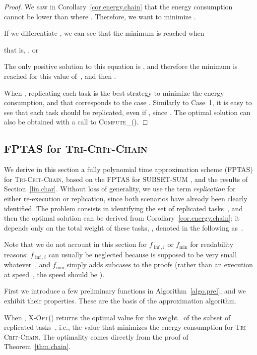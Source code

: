 \documentclass[a4paper]{article}
\theoremstyle{plain}
\theoremstyle{definition}
\theoremstyle{remark}
\newcommand{\fmin}{\ensuremath{f_{\min}}\xspace}
\newcommand{\finf}{\ensuremath{f_{\inf,i}}\xspace}
\newcommand{\xopt}{\textsc{X-Opt}}
\newcommand{\computeVl}{\textsc{Compute\_}}
\newcommand{\chain}{\textsc{Tri-Crit-Chain}\xspace}
\begin{document}
\begin{proof}
We saw in Corollary~\ref{cor.energy.chain} that the energy consumption
cannot be lower than  where .  Therefore, we want to minimize .

If we differentiate , we can see that the minimum is reached when 

that 
is, , or 

The only positive solution to this equation is , and
therefore the minimum is reached for this value of~, and then 
.  

When , replicating each task is the best strategy to 
minimize the energy consumption, and that corresponds to the case 
. Similarly to Case~1, it is easy to see that
each task should be replicated, even if , since \mbox{.} The optimal solution can also be obtained with a
call to \computeVl(). 
\end{proof}


\subsection{FPTAS for \chain}
\label{lin.fptas}

We derive in this section a fully polynomial time approximation scheme
(FPTAS) for \chain, based on the FPTAS for SUBSET-SUM \cite{cormen},
and the results of Section~\ref{lin.char}. Without loss of generality,
we use the term {\em replication} for either re-execution or
replication, since both scenarios have already been clearly
identified. The problem consists in identifying the set of replicated
tasks~, and then the optimal solution can be derived from
Corollary~\ref{cor.energy.chain}; it depends only on the total weight
of these tasks, , denoted in the following
as~.

Note that we do not account in this section for \finf or \fmin for
readability reasons: \finf can usually be neglected because  is supposed to be very small whatever~, and \fmin simply
adds subcases to the proofs (rather than an execution at speed~,
the speed should be ).


\medskip
First we introduce a few preliminary functions in
Algorithm~\ref{algo.prel}, and we exhibit their properties. These are
the basis of the approximation algorithm. 

When , \xopt() returns the optimal value for
the weight~ of the subset of replicated tasks~, i.e.,
the value that minimizes the energy consumption for \chain. 
The optimality comes directly from the proof of Theorem~\ref{thm.chain}. 
\end{document}
